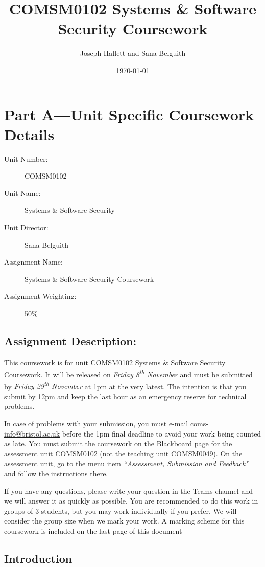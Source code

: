\documentclass{article}
\title{COMSM0102 Systems \& Software Security Coursework}
\author{Joseph Hallett and Sana Belguith}
\date\today
\newcommand\releasedate[0]{Friday 8\textsuperscript{th} November}
\newcommand\duedate[0]{Friday 29\textsuperscript{th} November}
\begin{document}
\maketitle
\section*{Part A---Unit Specific Coursework Details}

\begin{description}
\item[Unit Number:] COMSM0102
\item[Unit Name:] Systems \& Software Security
\item[Unit Director:] Sana Belguith
\item[Assignment Name:] Systems \& Software Security Coursework
\item[Assignment Weighting:] 50\%
\end{description}

\subsection*{Assignment Description:}

This coursework is for unit COMSM0102 Systems \& Software Security
Coursework. It will be released on \emph{\releasedate} and must be
submitted by \emph{\duedate} at 1pm at the very latest. The
intention is that you submit by 12pm and keep the last hour as an
emergency reserve for technical problems.

In case of problems with your submission, you must e-mail
\href{mailto://coms-info@bristol.ac.uk}{coms-info@bristol.ac.uk}
before the 1pm final deadline to avoid your work being counted as
late. You must submit the coursework on the Blackboard page for the
assessment unit COMSM0102 (not the teaching unit COMSM0049). On the
assessment unit, go to the menu item \emph{``Assessment, Submission and
  Feedback"} and follow the instructions there.

If you have any questions, please write your question in the Teams
channel and we will answer it as quickly as possible. You are
recommended to do this work in groups of 3 students, but you may work
individually if you prefer. We will consider the group size when we mark
your work. A marking scheme for this coursework is included on the last
page of this document

\subsection*{Introduction}
\end{document}
